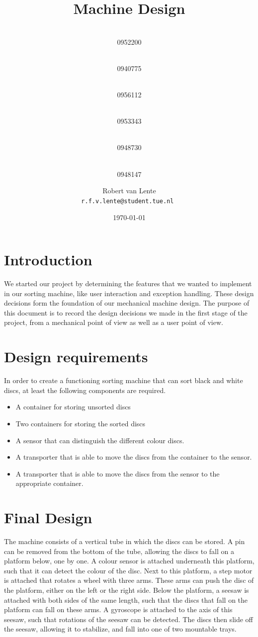 \documentclass[a4paper,oneside,11pt]{article}
\title{\vspace{-\baselineskip}\sffamily\bfseries Machine Design}
\author{
	\makebox[.25\linewidth]{Sergio van Amerongen}\\0952200 \and
	\makebox[.25\linewidth]{Stefan Cloudt}\\0940775 \and
	\makebox[.25\linewidth]{Daan de Graaf}\\0956112 \and
	\makebox[.25\linewidth]{Robert van Lente}\\0953343 \and
	\makebox[.25\linewidth]{Tom Peters}\\0948730 \and
	\makebox[.25\linewidth]{Berrie Trippe}\\0948147 
	\and \makebox[.75\linewidth]{\textbf{Responsible:}} \and
	Robert van Lente\\ \tt{r.f.v.lente@student.tue.nl}
}
\date{\today}
\begin{document}
\maketitle

\section{Introduction}
We started our project by determining the features that we wanted to implement in our sorting machine, like user interaction and exception handling. These design decisions form the foundation of our mechanical machine design. The purpose of this document is to record the design decisions we made in the first stage of the project, from a mechanical point of view as well as
a user point of view.

\section{Design requirements}
In order to create a functioning sorting machine that can sort black and white discs, at least the following components are required.
\begin{itemize}
\item A container for storing unsorted discs
\item Two containers for storing the sorted discs
\item A sensor that can distinguish the different colour discs.
\item A transporter that is able to move the discs from the container to the sensor.
\item A transporter that is able to move the discs from the sensor to the appropriate container.
\end{itemize}

\section{Final Design}
The machine consists of a vertical tube in which the discs can be stored. A pin can be removed from the bottom of the tube, allowing the discs to fall on a platform below, one by one. A colour sensor is attached underneath this platform, such that it can detect the colour of the disc.
Next to this platform, a step motor is attached that rotates a wheel with three arms. These arms can push the disc of the platform, either on the left or the right side.
Below the platform, a seesaw is attached with both sides of the same length, such that the discs that fall on the platform can fall on these arms. A gyroscope is attached to the axis of this seesaw, such that rotations of the seesaw can be detected.
The discs then slide off the seesaw, allowing it to stabilize, and fall into one of two mountable trays.
\end{document}
